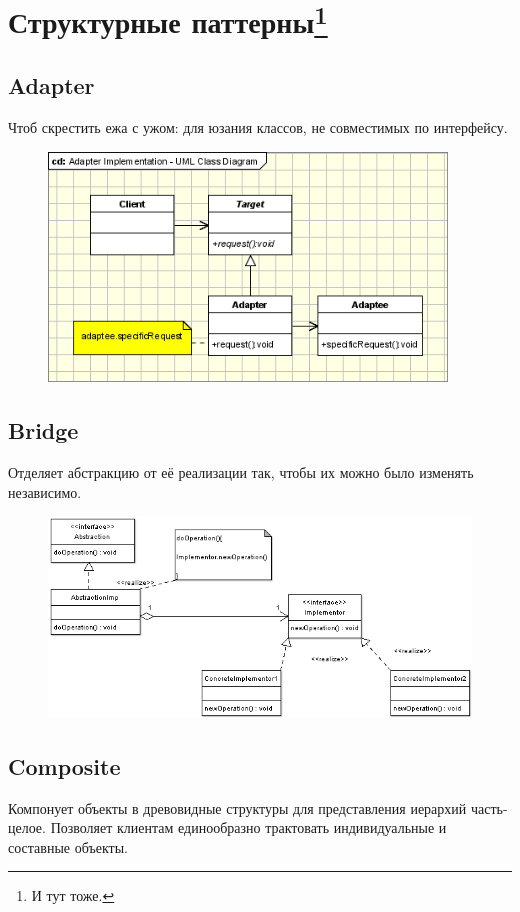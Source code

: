 \documentclass[11pt,a4paper]{article}
\begin{document}
\section{Структурные паттерны\footnote{И тут тоже.}}
\subsection{Adapter}
Чтоб скрестить ежа с ужом: для юзания классов, не совместимых по интерфейсу.

\begin{figure}[H]
	\centering
	\includegraphics[width=300pt]{pics/adapter-pattern.png}
\end{figure}

\subsection{Bridge}
Отделяет абстракцию от её реализации так, чтобы их можно было изменять независимо.

\begin{figure}[H]
	\centering
	\includegraphics[width=400pt]{pics/bridge-pattern.png}
\end{figure}

\subsection{Composite}
Компонует объекты в древовидные структуры для представления иерархий часть-целое. Позволяет клиентам единообразно трактовать индивидуальные и составные объекты.
\end{document}
